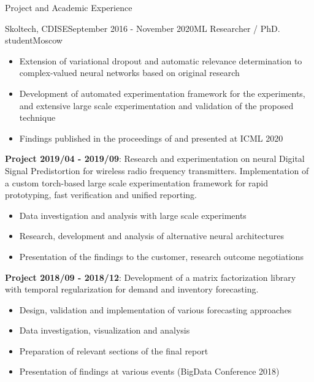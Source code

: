 \documentclass{resume} %
\begin{document}
\begin{rSection}{Project and Academic Experience}
\begin{rSubsection}{Skoltech, CDISE}{September 2016 - November 2020}{ML Researcher / PhD. student}{Moscow}
\begin{itemize}
        \item Extension of variational dropout and automatic relevance determination to
        complex-valued neural networks based on original research
        
        \item Development of automated experimentation framework for the experiments, and
        extensive large scale experimentation and validation of the proposed technique
        
        \item Findings published in the proceedings of and presented at ICML 2020
    \end{itemize}

    \medskip
    \item \textbf{Project 2019/04 - 2019/09}:
    Research and experimentation on neural Digital Signal Predistortion for wireless radio
    frequency transmitters. Implementation of a custom torch-based large scale experimentation framework
    for rapid prototyping, fast verification and unified reporting. \begin{itemize}
        \item Data investigation and analysis with large scale experiments
        
        \item Research, development and analysis of alternative neural architectures
        
        \item Presentation of the findings to the customer, research outcome negotiations
    \end{itemize}

    \medskip
    \item \textbf{Project 2018/09 - 2018/12}:
    Development of a matrix factorization library with temporal regularization for demand
    and inventory forecasting. \begin{itemize}
        \item Design, validation and implementation of various forecasting approaches
        
        \item Data investigation, visualization and analysis
        
        \item Preparation of relevant sections of the final report
        
        \item Presentation of findings at various events (BigData Conference 2018)
    \end{itemize}


\end{rSubsection}
\end{rSection}
\end{document}
